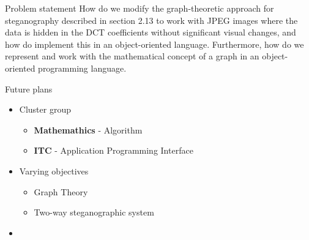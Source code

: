
	
		





\begin{frame}{Problem statement}{}
How do we modify the graph-theoretic approach
for steganography described in section 2.13 to work
with JPEG images where the data is hidden in the
DCT coefficients without significant visual changes,
and how do implement this in an object-oriented
language. Furthermore, how do we represent and
work with the mathematical concept of a graph in
an object-oriented programming language.
\end{frame}



\begin{frame}{Future plans}{}
	\begin{itemize}
		\item Cluster group
        \begin{itemize}
            \item \textbf{Mathemathics} - Algorithm 
            \item \textbf{ITC} - Application Programming Interface
        \end{itemize}
		\item Varying objectives
        \begin{itemize}
            \item Graph Theory 
            \item Two-way steganographic system
        \end{itemize}
		\item
	\end{itemize}
\end{frame}



